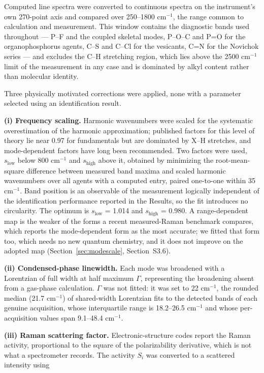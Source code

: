 \documentclass[review,12pt]{elsarticle}
\newcommand*\wn{\ensuremath{\text{cm}^{-1}}}
\begin{document}
Computed line spectra were converted to continuous spectra on the instrument's own 270-point axis and compared over 250--1800 \wn{}, the range common to calculation and measurement. This window contains the diagnostic bands used throughout --- P--F and the coupled skeletal modes, P--O--C and P=O for the organophosphorus agents, C--S and C--Cl for the vesicants, C=N for the Novichok series --- and excludes the C--H stretching region, which lies above the 2500 \wn{} limit of the measurement in any case and is dominated by alkyl content rather than molecular identity.

Three physically motivated corrections were applied, none with a parameter selected using an identification result.

\textbf{(i) Frequency scaling.} Harmonic wavenumbers were scaled for the systematic overestimation of the harmonic approximation; published factors for this level of theory lie near 0.97 for fundamentals but are dominated by X--H stretches, and mode-dependent factors have long been recommended.\cite{scott1996harmonic,rauhut1995transferable,halls2001harmonic,andersson2005newscale,merrick2007evaluation,alecu2010computational} Two factors were used, $s_{\mathrm{low}}$ below 800 \wn{} and $s_{\mathrm{high}}$ above it, obtained by minimizing the root-mean-square difference between measured band maxima and scaled harmonic wavenumbers over all agents with a computed entry, paired one-to-one within 35 \wn{}. Band position is an observable of the measurement logically independent of the identification performance reported in the Results, so the fit introduces no circularity. The optimum is $s_{\mathrm{low}}$ = 1.014 and $s_{\mathrm{high}}$ = 0.980. A range-dependent map is the weaker of the forms a recent measured-Raman benchmark compares, which reports the mode-dependent form as the most accurate;\cite{rahimi2026spectral} we fitted that form too, which needs no new quantum chemistry, and it does not improve on the adopted map (Section~\ref{sec:modescale}, Section~S3.6).

\textbf{(ii) Condensed-phase linewidth.} Each mode was broadened with a Lorentzian of full width at half maximum $\Gamma$, representing the broadening absent from a gas-phase calculation. $\Gamma$ was not fitted: it was set to 22 \wn{}, the rounded median (21.7 \wn{}) of shared-width Lorentzian fits to the detected bands of each genuine acquisition, whose interquartile range is 18.2--26.5 \wn{} and whose per-acquisition values span 9.1--48.4 \wn{}.

\textbf{(iii) Raman scattering factor.} Electronic-structure codes report the Raman activity, proportional to the square of the polarizability derivative, which is not what a spectrometer records.\cite{komornicki1979efficient} The activity $S_i$ was converted to a scattered intensity using
\end{document}
